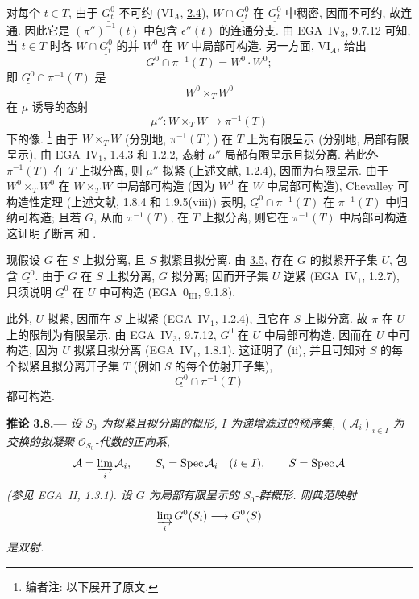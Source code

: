 对每个 \(t\in T\), 由于 \(\underline{G_t^0}\) 不可约
(VI\(_A\), \hyperref[prop:sga3-VIA-2.4]{2.4}),
\(W\cap\underline{G_t^0}\) 在 \(\underline{G_t^0}\) 中稠密,
因而不可约, 故连通.
因此它是 \((\pi'')^{-1}(t)\) 中包含 \(\epsilon''(t)\) 的连通分支.
由 EGA~IV\(_3\), 9.7.12 可知,
当 \(t\in T\) 时各 \(W\cap\underline{G_t^0}\) 的并 \(W^0\)
在 \(W\) 中局部可构造.
另一方面, VI\(_A\),  给出
\[
  \underline{G^0}\cap\pi^{-1}(T)=W^0\cdot W^0;
\]
即 \(\underline{G^0}\cap\pi^{-1}(T)\) 是
\[
  W^0\times_T W^0
\]
在 \(\mu\) 诱导的态射
\[
  \mu'':W\times_T W\longrightarrow\pi^{-1}(T)
\]
下的像.%
\footnote{\label{note:sga3-VIB-25}编者注: 以下展开了原文.}
由于 \(W\times_T W\) (分别地, \(\pi^{-1}(T)\))
在 \(T\) 上为有限呈示 (分别地, 局部有限呈示),
由 EGA~IV\(_1\), 1.4.3 和 1.2.2,
态射 \(\mu''\) 局部有限呈示且拟分离.
若此外 \(\pi^{-1}(T)\) 在 \(T\) 上拟分离,
则 \(\mu''\) 拟紧 (上述文献, 1.2.4), 因而为有限呈示.
由于 \(W^0\times_T W^0\) 在 \(W\times_T W\) 中局部可构造
(因为 \(W^0\) 在 \(W\) 中局部可构造),
Chevalley 可构造性定理 (上述文献, 1.8.4 和 1.9.5(viii)) 表明,
\(\underline{G^0}\cap\pi^{-1}(T)\) 在 \(\pi^{-1}(T)\) 中归纳可构造;
且若 \(G\), 从而 \(\pi^{-1}(T)\), 在 \(T\) 上拟分离,
则它在 \(\pi^{-1}(T)\) 中局部可构造.
这证明了断言 \textup{} 和
\textup{}.

现假设 \(G\) 在 \(S\) 上拟分离, 且 \(S\) 拟紧且拟分离.
由 \hyperref[prop:sga3-VIB-3.5]{3.5},
存在 \(G\) 的拟紧开子集 \(U\), 包含 \(\underline{G^0}\).
由于 \(G\) 在 \(S\) 上拟分离, \(G\) 拟分离;
因而开子集 \(U\) 逆紧 (EGA~IV\(_1\), 1.2.7),
只须说明 \(\underline{G^0}\) 在 \(U\) 中可构造
(EGA~0\(_{\mathrm{III}}\), 9.1.8).

此外, \(U\) 拟紧, 因而在 \(S\) 上拟紧 (EGA~IV\(_1\), 1.2.4),
且它在 \(S\) 上拟分离.
故 \(\pi\) 在 \(U\) 上的限制为有限呈示.
由 EGA~IV\(_3\), 9.7.12, \(\underline{G^0}\) 在 \(U\) 中局部可构造,
因而在 \(U\) 中可构造, 因为 \(U\) 拟紧且拟分离
(EGA~IV\(_1\), 1.8.1).
这证明了 \textup{(ii)}, 并且可知对 \(S\) 的每个拟紧且拟分离开子集
\(T\) (例如 \(S\) 的每个仿射开子集),
\[
  \underline{G^0}\cap\pi^{-1}(T)
\]
都可构造.

\medskip
{}\label{cor:sga3-VIB-3.8}%
\noindent\textbf{推论 3.8.---}
\emph{设 \(S_0\) 为拟紧且拟分离的概形,
\(I\) 为递增滤过的预序集,
\((\mathcal A_i)_{i\in I}\) 为交换的拟凝聚 \(\mathcal O_{S_0}\)-代数的正向系,}
\[
  \mathcal A=\varinjlim_i\mathcal A_i,\qquad
  S_i=\operatorname{Spec}\mathcal A_i\quad(i\in I),\qquad
  S=\operatorname{Spec}\mathcal A
\]
\emph{\textup{(参见 EGA~II, 1.3.1)}.
设 \(G\) 为局部有限呈示的 \(S_0\)-群概形. 则典范映射}
\[
  \varinjlim_i G^0(S_i)\longrightarrow G^0(S)
\]
\emph{是双射.}

